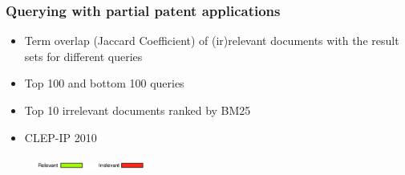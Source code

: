 \documentclass[xcolor=x11names,compress]{beamer}
\renewcommand{\(}{\begin{columns}}
\renewcommand{\)}{\end{columns}}
\newcommand{\<}[1]{\begin{column}{#1}}
\renewcommand{\>}{\end{column}}
\begin{document}
\begin{frame}
\frametitle{Querying with partial patent applications}

\begin{tiny}
\begin{itemize}
\item Term overlap (Jaccard Coefficient) of (ir)relevant documents with the result sets for different queries
\item Top 100 and bottom 100 queries
\item Top 10 irrelevant documents ranked by BM25 \citep{Robertson1993}
\item CLEP-IP 2010  
\end{itemize}
\end{tiny}

\begin{small}
\begin{figure}
\includegraphics[width=3.5cm]{../img/legend} 

\end{figure}
\end{small}
\end{frame}
\end{document}
